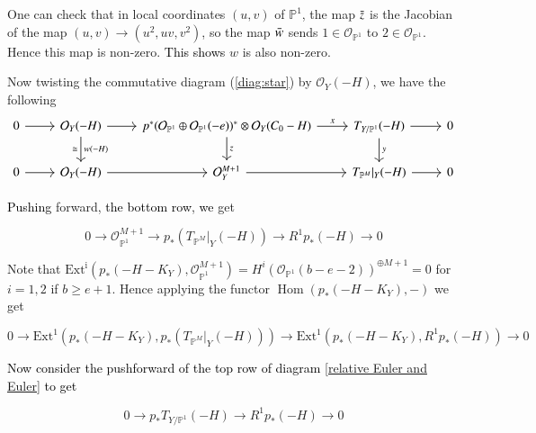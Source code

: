 \documentclass[11pt,twoside]{amsart}
\theoremstyle{plain}
\numberwithin{equation}{section}
\theoremstyle{definition}
\begin{document}
One can check that in local coordinates $(u,v)$ of $\mathbb{P}^1$, the map $\Bar{z}$ is the Jacobian of the map $(u,v) \to (u^2, uv, v^2)$, so the map $\Bar{w}$ sends $1 \in \mathcal{O}_{\mathbb{P}^1}$ to $2 \in \mathcal{O}_{\mathbb{P}^1}$. Hence this map is non-zero. \textcolor{black}{This shows} $w$ is also non-zero. 


Now twisting the commutative diagram (\ref{diag:star}) by $\mathcal{O}_Y(-H)$, we have the following
\begin{equation}
\begin{tikzcd}\label{relative Euler and Euler}
  0 \arrow[r] & \mathcal{O}_Y(-H) \arrow[r] \arrow[d, "w(-H)", "\cong"'] & p^*(\mathcal{O}_{\mathbb{P}^1} \oplus \mathcal{O}_{\mathbb{P}^1}(-e))^* \otimes \mathcal{O}_Y(C_0-H) \arrow[r, "x"] \arrow[d, "z"] & T_{Y/\mathbb{P}^1}(-H) \arrow[r] \arrow[d, "y"] & 0 \\
   0 \arrow[r] & \mathcal{O}_Y(-H) \arrow[r] & \mathcal{O}_Y^{M+1} \arrow[r] & T_{\mathbb{P}^M}|_Y(-H) \arrow[r] & 0
\end{tikzcd}
\end{equation}
\color{black}
 
\textcolor{black}{Pushing} forward, \textcolor{black}{the bottom row}, \textcolor{black}{we} get 

 \begin{equation}\label{25}
     0 \to \mathcal{O}_{\mathbb{P}^1}^{M+1} \to p_*(T_{\mathbb{P}^M}|_Y(-H)) \to R^1p_*(-H) \to 0
 \end{equation}

Note that $\operatorname{Ext^i}(p_*(-H-K_Y),  \mathcal{O}_{\mathbb{P}^1}^{M+1}) = H^i(\mathcal{O}_{\mathbb{P}^1}(b-e-2))^{\oplus M+1} = 0$ for $i = 1,2$ if $b \geq e+1$. Hence applying the functor $\operatorname{Hom}(p_*(-H-K_Y), -)$ we get 

\begin{equation}\label{26}
     0 \to \operatorname{Ext^1}(p_*(-H-K_Y), 
 p_*(T_{\mathbb{P}^M}|_Y(-H))) \to \operatorname{Ext^1}(p_*(-H-K_Y), 
 R^1p_*(-H)) \to 0
 \end{equation}










\textcolor{black}{Now consider the pushforward of the top row of diagram \ref{relative Euler and Euler} to get} 

\begin{equation}\label{29}
 0 \to p_*T_{Y/\mathbb{P}^1}(-H) \to R^1p_*(-H) \to 0 
\end{equation}
\end{document}
